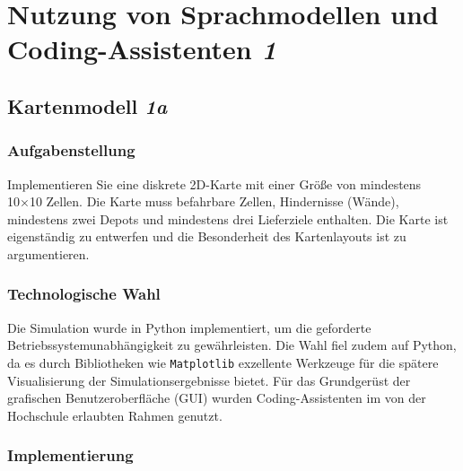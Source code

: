 
\chapter{Nutzung von Sprachmodellen und Coding-Assistenten \textit{1}}
\label{chap:aufgabe1}
\thispagestyle{fancy}


\section{Kartenmodell \textit{1a}}
\label{sec:aufgabe1a}

\subsection{Aufgabenstellung}

Implementieren Sie eine diskrete \acs{2D}-Karte mit einer Größe von mindestens 10×10 Zellen. Die Karte muss befahrbare Zellen, Hindernisse (Wände), mindestens zwei Depots und mindestens drei Lieferziele enthalten. Die Karte ist eigenständig zu entwerfen und die Besonderheit des Kartenlayouts ist zu argumentieren.

\subsection{Technologische Wahl}

Die Simulation wurde in Python implementiert, um die geforderte Betriebssystemunabhängigkeit zu gewährleisten. Die Wahl fiel zudem auf Python, da es durch Bibliotheken wie \texttt{Matplotlib} exzellente Werkzeuge für die spätere Visualisierung der Simulationsergebnisse bietet. Für das Grundgerüst der grafischen Benutzeroberfläche (\acs{GUI}) wurden Coding-Assistenten im von der Hochschule erlaubten Rahmen genutzt.

\subsection{Implementierung}

